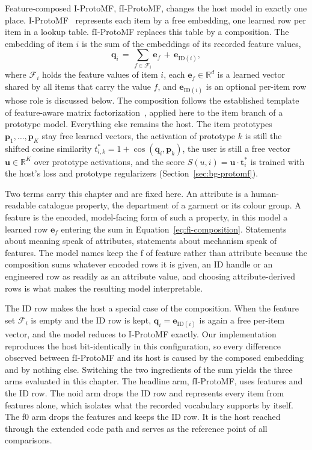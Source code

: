 Feature-composed I-ProtoMF, fI-ProtoMF, changes the host model in exactly
one place. I-ProtoMF~\cite{melchiorre2022protomf} represents each item by
a free embedding, one learned row per item in a lookup table. fI-ProtoMF
replaces this table by a composition. The embedding of item $i$ is the
sum of the embeddings of its recorded feature values,
\begin{equation}
\mathbf{q}_i \,=\, \sum_{f \in \mathcal{F}_i} \mathbf{e}_f
\,+\, \mathbf{e}_{\mathrm{ID}(i)},
\label{eq:fi-composition}
\end{equation}
where $\mathcal{F}_i$ holds the feature values of item $i$, each
$\mathbf{e}_f \in \mathbb{R}^d$ is a learned vector shared by all items
that carry the value $f$, and $\mathbf{e}_{\mathrm{ID}(i)}$ is an
optional per-item row whose role is discussed below. The composition
follows the established template of feature-aware matrix
factorization~\cite{chen2012svdfeature,kula2015lightfm}, applied here to
the item branch of a prototype model. Everything else remains the host.
The item prototypes $\mathbf{p}_1, \dots, \mathbf{p}_K$ stay free
learned vectors, the activation of prototype $k$ is still the shifted
cosine similarity $t^*_{i,k} = 1 + \cos(\mathbf{q}_i, \mathbf{p}_k)$,
the user is still a free vector $\mathbf{u} \in \mathbb{R}^K$ over
prototype activations, and the score
$S(u,i) = \mathbf{u} \cdot \mathbf{t}^*_i$ is trained with the host's
loss and prototype regularizers (Section~\ref{sec:bg-protomf}).

Two terms carry this chapter and are fixed here. An attribute is a
human-readable catalogue property, the department of a garment or its
colour group. A feature is the encoded, model-facing form of such a
property, in this model a learned row $\mathbf{e}_f$ entering the sum in
Equation~\ref{eq:fi-composition}. Statements about meaning speak of
attributes, statements about mechanism speak of features. The model
names keep the f of feature rather than attribute because the
composition sums whatever encoded rows it is given, an ID handle or an
engineered row as readily as an attribute value, and choosing
attribute-derived rows is what makes the resulting model interpretable.

The ID row makes the host a special case of the composition. When the
feature set $\mathcal{F}_i$ is empty and the ID row is kept,
$\mathbf{q}_i = \mathbf{e}_{\mathrm{ID}(i)}$ is again a free per-item
vector, and the model reduces to I-ProtoMF exactly. Our implementation
reproduces the host bit-identically in this configuration, so every
difference observed between fI-ProtoMF and its host is caused by the
composed embedding and by nothing else. Switching the two ingredients of
the sum yields the three arms evaluated in this chapter. The headline
arm, fI-ProtoMF, uses features and the ID row. The noid arm drops the ID
row and represents every item from features alone, which isolates what
the recorded vocabulary supports by itself. The f0 arm drops the
features and keeps the ID row. It is the host reached through the
extended code path and serves as the reference point of all comparisons.

